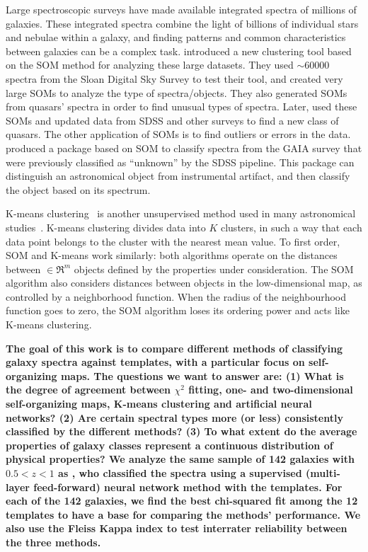 Large spectroscopic surveys have made available integrated spectra of millions of galaxies.
These integrated spectra combine the light of billions of individual stars and nebulae within a galaxy, and
finding patterns and common characteristics between galaxies can be a complex task.
\citet{In12} introduced a new clustering tool based on the SOM method for analyzing these large datasets.
They used $\sim 60000$ spectra from the Sloan Digital Sky Survey \citep[SDSS;][]{Abazajian09} to test their tool, and created very large SOMs to analyze the type of spectra/objects.
They also generated SOMs from quasars' spectra in order to find unusual types of spectra. 
Later, \citet{Meusinger16} used these SOMs and updated data from SDSS and other surveys to find a new class of quasars.
The other application of SOMs is to find outliers or errors in the data.
\citet{Fustes13} produced a package based on SOM to classify spectra from the GAIA survey that were previously classified as ``unknown'' by the SDSS pipeline. This package can distinguish an astronomical object from instrumental artifact, and then classify the object based on its spectrum.


K-means clustering~\citep{Macqueen67} is another unsupervised method used in many astronomical studies~\citep[e.g.][]{DAbrusco12,Ordov14,Boersma14,Aycha16}.
K-means clustering divides data into $K$ clusters, in such a way that each data point belongs to the cluster with the nearest mean value.
To first order, SOM and K-means work similarly: both algorithms operate on the distances between  $\in \Re^m$ objects defined by the properties under consideration.
The SOM algorithm also considers distances between objects in the low-dimensional map, as  controlled by a neighborhood function. 
When the radius of the neighbourhood function goes to zero, the SOM algorithm loses its ordering power and acts like K-means clustering.


\textbf{
The goal of this work is to compare different methods of classifying galaxy spectra against templates, with a particular focus on self-organizing maps. 
The questions we want to answer are: 
(1) What is the degree of agreement between $\chi^2$ fitting, one- and two-dimensional self-organizing maps, K-means clustering and artificial neural networks? 
(2) Are certain spectral types more (or less) consistently classified by the different methods? 
(3) To what extent do the average properties of galaxy classes represent a continuous distribution of physical properties?
We analyze the same sample of 142 galaxies with $0.5 < z < 1$ as 
\citet[][hereafter ]{Hossein12}, who classified the spectra using a supervised (multi-layer feed-forward) neural network method with the  templates.
For each of the 142 galaxies, we find the best chi-squared fit among the 12 templates  to have a base for comparing the methods' performance.
We also use the Fleiss Kappa index \citet{Fleiss71} to test interrater reliability  
between the three methods.
}

